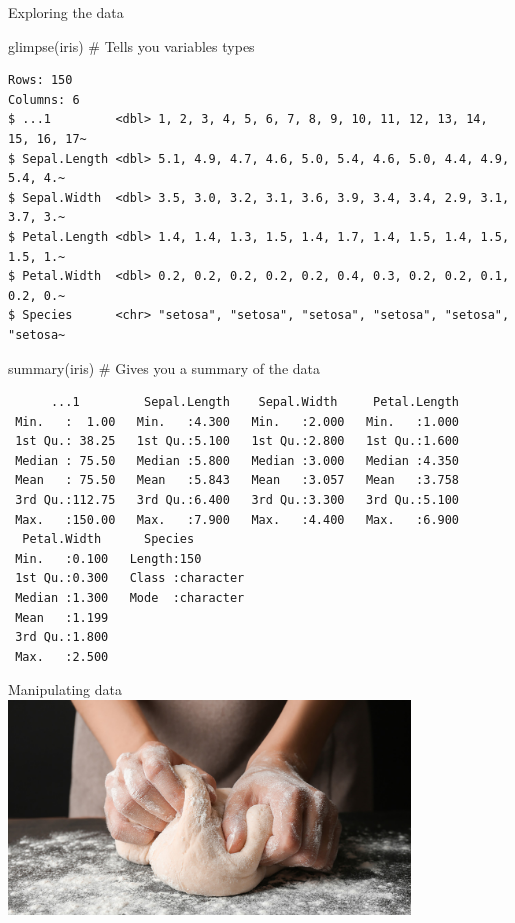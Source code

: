 \documentclass[
  ignorenonframetext,
  aspectratio=169,
]{beamer}
\newenvironment{Shaded}{\begin{snugshade}}{\end{snugshade}}
\newcommand{\CommentTok}[1]{\textcolor[rgb]{0.37,0.37,0.37}{#1}}
\newcommand{\FunctionTok}[1]{\textcolor[rgb]{0.28,0.35,0.67}{#1}}
\newcommand{\NormalTok}[1]{\textcolor[rgb]{0.00,0.23,0.31}{#1}}
\begin{document}
\begin{frame}[fragile]{Exploring the data}
\label{exploring-the-data-1}
\begin{Shaded}
\begin{Highlighting}[]
\FunctionTok{glimpse}\NormalTok{(iris) }\CommentTok{\# Tells you variables types }
\end{Highlighting}
\end{Shaded}

\begin{verbatim}
Rows: 150
Columns: 6
$ ...1         <dbl> 1, 2, 3, 4, 5, 6, 7, 8, 9, 10, 11, 12, 13, 14, 15, 16, 17~
$ Sepal.Length <dbl> 5.1, 4.9, 4.7, 4.6, 5.0, 5.4, 4.6, 5.0, 4.4, 4.9, 5.4, 4.~
$ Sepal.Width  <dbl> 3.5, 3.0, 3.2, 3.1, 3.6, 3.9, 3.4, 3.4, 2.9, 3.1, 3.7, 3.~
$ Petal.Length <dbl> 1.4, 1.4, 1.3, 1.5, 1.4, 1.7, 1.4, 1.5, 1.4, 1.5, 1.5, 1.~
$ Petal.Width  <dbl> 0.2, 0.2, 0.2, 0.2, 0.2, 0.4, 0.3, 0.2, 0.2, 0.1, 0.2, 0.~
$ Species      <chr> "setosa", "setosa", "setosa", "setosa", "setosa", "setosa~
\end{verbatim}

\begin{Shaded}
\begin{Highlighting}[]
\FunctionTok{summary}\NormalTok{(iris) }\CommentTok{\# Gives you a summary of the data}
\end{Highlighting}
\end{Shaded}

\begin{verbatim}
      ...1         Sepal.Length    Sepal.Width     Petal.Length  
 Min.   :  1.00   Min.   :4.300   Min.   :2.000   Min.   :1.000  
 1st Qu.: 38.25   1st Qu.:5.100   1st Qu.:2.800   1st Qu.:1.600  
 Median : 75.50   Median :5.800   Median :3.000   Median :4.350  
 Mean   : 75.50   Mean   :5.843   Mean   :3.057   Mean   :3.758  
 3rd Qu.:112.75   3rd Qu.:6.400   3rd Qu.:3.300   3rd Qu.:5.100  
 Max.   :150.00   Max.   :7.900   Max.   :4.400   Max.   :6.900  
  Petal.Width      Species         
 Min.   :0.100   Length:150        
 1st Qu.:0.300   Class :character  
 Median :1.300   Mode  :character  
 Mean   :1.199                     
 3rd Qu.:1.800                     
 Max.   :2.500                     
\end{verbatim}
\end{frame}

\begin{frame}{Manipulating data}
\label{manipulating-data}
\includegraphics[width=0.8\textwidth,height=\textheight]{Intro_R_files/mediabag/person-making-fresh-.jpg}
\end{frame}
\end{document}
